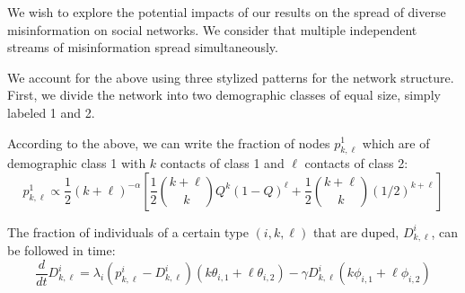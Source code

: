 \documentclass{article}
\begin{document}
\begin{tcolorbox}[title=Box 1: Mathematical model of diverse misinformation]
We wish to explore the potential impacts of our results on the spread of diverse misinformation on social networks. We consider that multiple independent streams of misinformation spread simultaneously.

We account for the above using three stylized patterns for the network structure. First, we divide the network into two demographic classes of equal size, simply labeled 1 and 2.

According to the above, we can write the fraction of nodes $p^1_{k,\ell}$ which are of demographic class 1 with $k$ contacts of class 1 and $\ell$ contacts of class 2:
\begin{equation}
    p^1_{k,\ell} \propto \frac{1}{2}(k+\ell)^{-\alpha}\left[\frac{1}{2}\binom{k+\ell}{k}Q^k(1-Q)^\ell + \frac{1}{2}\binom{k+\ell}{k}(1/2)^{k+\ell}\right]
\end{equation}

The fraction of individuals of a certain type $(i,k,\ell)$ that are duped, $D^i_{k,\ell}$, can be followed in time:
\begin{equation}
    \frac{d}{dt} D^i_{k,\ell} = \lambda_i\left(p^i_{k,\ell}-D^i_{k,\ell}\right)\left(k\theta_{i,1}+\ell\theta_{i,2}\right)-\gamma D^i_{k,\ell}\left(k\phi_{i,1}+\ell\phi_{i,2}\right)
\end{equation}
\end{tcolorbox}
\end{document}
